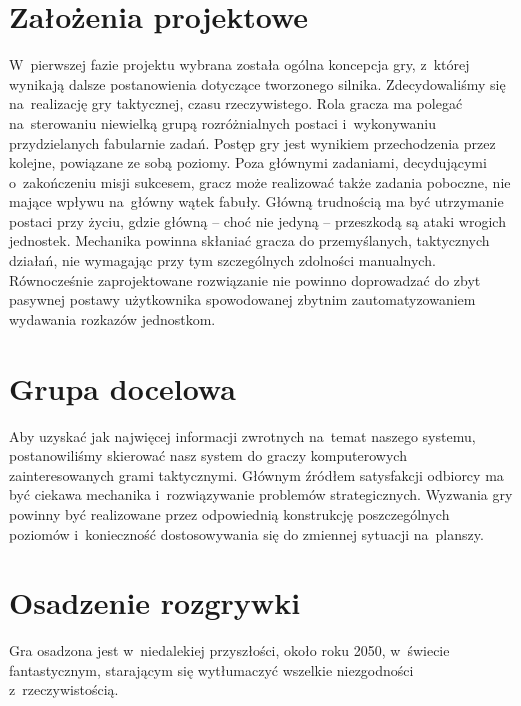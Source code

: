 \documentclass[licencjacka]{pracamgr}
\begin{document}
  \section{Założenia projektowe}
    W~pierwszej fazie projektu wybrana została ogólna koncepcja gry, z~której wynikają dalsze postanowienia dotyczące
    tworzonego silnika. Zdecydowaliśmy się na~realizację gry taktycznej, czasu rzeczywistego. Rola gracza ma polegać
    na~sterowaniu niewielką grupą rozróżnialnych postaci i~wykonywaniu przydzielanych fabularnie zadań. Postęp gry jest 
    wynikiem przechodzenia przez kolejne, powiązane ze sobą poziomy. Poza głównymi zadaniami, decydującymi o~zakończeniu
    misji sukcesem, gracz może realizować także zadania poboczne, nie mające wpływu na~główny wątek fabuły. Główną
    trudnością ma być utrzymanie postaci przy życiu, gdzie główną -- choć nie jedyną -- przeszkodą są ataki wrogich jednostek.
    Mechanika powinna skłaniać gracza do przemyślanych, taktycznych działań, nie wymagając przy tym szczególnych zdolności manualnych.
    Równocześnie zaprojektowane rozwiązanie nie powinno doprowadzać do zbyt pasywnej postawy użytkownika spowodowanej zbytnim
    zautomatyzowaniem wydawania rozkazów jednostkom.

  \section{Grupa docelowa}
    Aby uzyskać jak najwięcej informacji zwrotnych na~temat naszego systemu, postanowiliśmy skierować nasz system do
    graczy komputerowych zainteresowanych grami taktycznymi. Głównym źródłem satysfakcji odbiorcy ma być ciekawa mechanika
    i~rozwiązywanie problemów strategicznych. Wyzwania gry powinny być realizowane przez odpowiednią konstrukcję poszczególnych
    poziomów i~konieczność dostosowywania się do zmiennej sytuacji na~planszy.

  \section{Osadzenie rozgrywki}
    Gra osadzona jest w~niedalekiej przyszłości, około roku 2050, w~świecie fantastycznym, starającym się wytłumaczyć
    wszelkie niezgodności z~rzeczywistością. 
\end{document}
